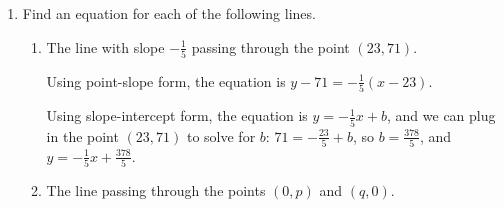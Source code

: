 \documentclass{article}
\begin{document}
\begin{enumerate}
\begin{enumerate}
    \begin{solution}
      The slope means that for every 1 dollar increase in
      price per item, the quantity of the good demanded decreases by 4
      units. 
    \end{solution}

  \item


    \begin{problem}[\vfill\newpage]
      If the item is priced at \$725, how many items will customers want to buy?
    \end{problem}

    \begin{solution}
      Based on our function, $q(725) = -4(725-750)+2200 = 2300$, so when the price per item
      is \$725, the quantity demanded will be 2300 units.
    \end{solution}

  \end{enumerate}

\item  Find an equation for each of the following lines.
  \begin{enumerate}

  \item
    \begin{problem}[\vfill]
      The line with slope $- \frac{1}{5}$ passing through the point $(23, 71)$. 
    \end{problem}

    \begin{solution}
      Using point-slope form, the equation is
      $\boxed{y - 71 = - \frac{1}{5} (x - 23)}$.

      Using slope-intercept form, the equation is
      $y = - \frac{1}{5} x + b$, and we can plug in the point $(23, 71)$
      to solve for $b$: $71 = -\frac{23}{5} + b$, so $b = \frac{378}{5}$, 
      and $\boxed{y = - \frac{1}{5} x + \frac{378}{5}}$. 
    \end{solution}

  \item
    \begin{problem}[\vfill]
      The line passing through the points $(0, p)$ and $(q, 0)$.
    \end{problem}


\end{enumerate}
\end{enumerate}
\end{document}
